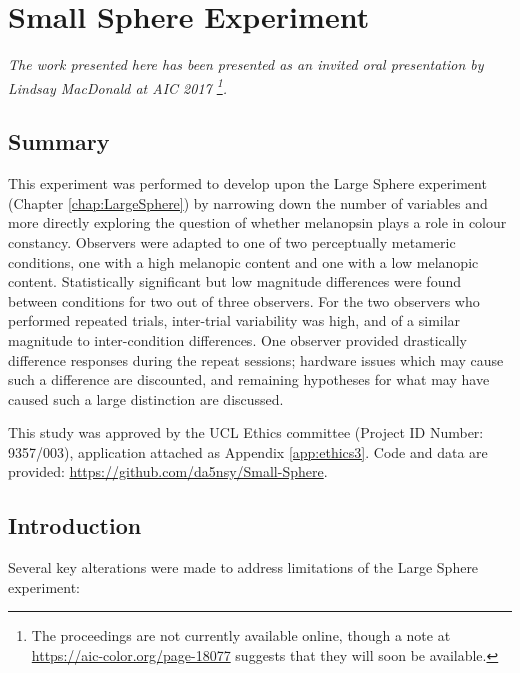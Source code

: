 \chapter{Small Sphere Experiment}
\label{chap:SmallSphere}

\textit{The work presented here has been presented as an invited oral presentation by Lindsay MacDonald at AIC 2017 \citep{macdonald_melanopsin_2017}\footnote{The proceedings are not currently available online, though a note at \url{https://aic-color.org/page-18077} suggests that they will soon be available.}.}


\section{Summary}

This experiment was performed to develop upon the Large Sphere experiment (Chapter \ref{chap:LargeSphere}) by narrowing down the number of variables and more directly exploring the question of whether melanopsin plays a role in colour constancy. Observers were adapted to one of two perceptually metameric conditions, one with a high melanopic content and one with a low melanopic content. Statistically significant but low magnitude differences were found between conditions for two out of three observers. For the two observers who performed repeated trials, inter-trial variability was high, and of a similar magnitude to inter-condition differences. One observer provided drastically difference responses during the repeat sessions; hardware issues which may cause such a difference are discounted, and remaining hypotheses for what may have caused such a large distinction are discussed. 

This study was approved by the \gls{UCL} Ethics committee (Project ID Number: 9357/003), application attached as Appendix \ref{app:ethics3}. Code and data are provided: \url{https://github.com/da5nsy/Small-Sphere}.

\section{Introduction}

Several key alterations were made to address limitations of the Large Sphere experiment:

